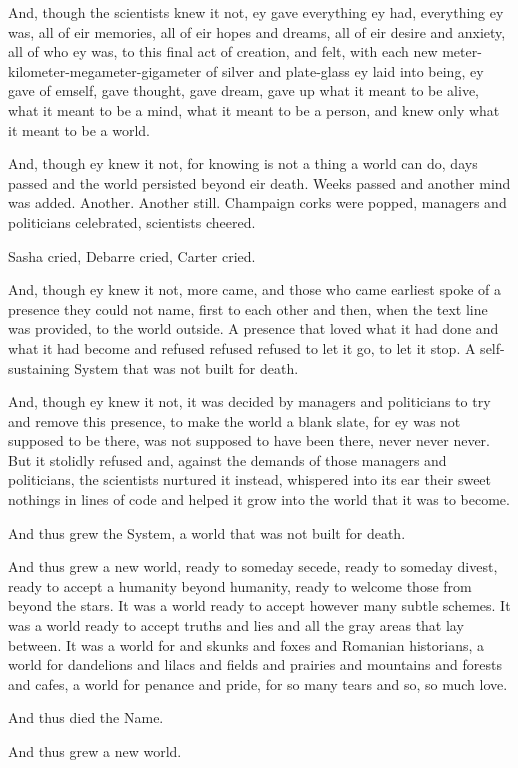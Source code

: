 And, though the scientists knew it not, ey gave everything ey had, everything ey was, all of eir memories, all of eir hopes and dreams, all of eir desire and anxiety, all of who ey was, to this final act of creation, and felt, with each new meter-kilometer-megameter-gigameter of silver and plate-glass ey laid into being, ey gave of emself, gave thought, gave dream, gave up what it meant to be alive, what it meant to be a mind, what it meant to be a person, and knew only what it meant to be a world.

And, though ey knew it not, for knowing is not a thing a world can do, days passed and the world persisted beyond eir death. Weeks passed and another mind was added. Another. Another still. Champaign corks were popped, managers and politicians celebrated, scientists cheered.

Sasha cried, Debarre cried, Carter cried.

And, though ey knew it not, more came, and those who came earliest spoke of a presence they could not name, first to each other and then, when the text line was provided, to the world outside. A presence that loved what it had done and what it had become and refused refused refused to let it go, to let it stop. A self-sustaining System that was not built for death.

And, though ey knew it not, it was decided by managers and politicians to try and remove this presence, to make the world a blank slate, for ey was not supposed to be there, was not supposed to have been there, never never never. But it stolidly refused and, against the demands of those managers and politicians, the scientists nurtured it instead, whispered into its ear their sweet nothings in lines of code and helped it grow into the world that it was to become.

And thus grew the System, a world that was not built for death.

And thus grew a new world, ready to someday secede, ready to someday divest, ready to accept a humanity beyond humanity, ready to welcome those from beyond the stars. It was a world ready to accept however many subtle schemes. It was a world ready to accept truths and lies and all the gray areas that lay between. It was a world for and skunks and foxes and Romanian historians, a world for dandelions and lilacs and fields and prairies and mountains and forests and cafes, a world for penance and pride, for so many tears and so, so much love.

And thus died the Name.

And thus grew a new world.
